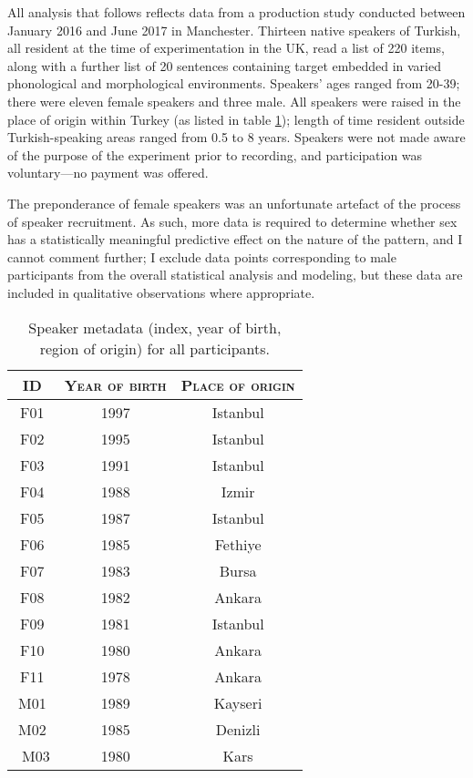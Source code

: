 All analysis that follows reflects data from a production study conducted between January 2016 and June 2017 in Manchester. Thirteen native speakers of Turkish, all resident at the time of experimentation in the UK, read a list of 220 items, along with a further list of 20 sentences containing target  embedded in varied phonological and morphological environments. Speakers' ages ranged from 20-39; there were eleven female speakers and three male. All speakers were raised in the place of origin within Turkey (as listed in table \ref{tab:tr_metadata}); length of time resident outside Turkish-speaking areas ranged from 0.5 to 8 years. Speakers were not made aware of the purpose of the experiment prior to recording, and participation was voluntary---no payment was offered.

The preponderance of female speakers was an unfortunate artefact of the process of speaker recruitment. As such, more data is required to determine whether sex has a statistically meaningful predictive effect on the nature of the pattern, and I cannot comment further; I exclude data points corresponding to male participants from the overall statistical analysis and modeling, but these data are included in qualitative observations where appropriate.

\begin{table}[H]
  \centering
  \begin{tabular}{ccc}
      \toprule
      \textsc{ID} & \textsc{Year of birth} & \textsc{Place of origin}\\
      \midrule
      F01 & 1997 & Istanbul \\
      F02 & 1995 & Istanbul \\
      F03 & 1991 & Istanbul \\
      F04 & 1988 & Izmir \\
      F05 & 1987 & Istanbul \\
      F06 & 1985 & Fethiye \\
      F07 & 1983 & Bursa \\
      F08 & 1982 & Ankara \\
      F09 & 1981 & Istanbul \\
      F10 & 1980 & Ankara \\
      F11 & 1978 & Ankara \\
      M01 & 1989 & Kayseri \\
      M02 & 1985 & Denizli \\
      \ M03\footnotemark & 1980 & Kars\\
      \bottomrule
    \end{tabular}
  \caption{Speaker metadata (index, year of birth, region of origin) for all participants.}
  \label{tab:tr_metadata}
\end{table}


